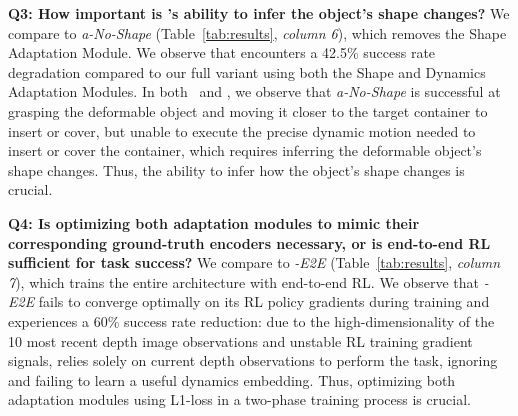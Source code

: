 \textbf{Q3: How important is \methodname{}'s ability to infer the object's shape changes?} We compare \methodname{} to \textit{a\methodname{}-No-Shape} (Table~\ref{tab:results}, \textit{column 6}), which removes the Shape Adaptation Module. We observe that \methodname{} encounters a 42.5\% success rate degradation compared to our full variant using both the Shape and Dynamics Adaptation Modules. In both \taskone~and \tasktwo, we observe that \textit{a\methodname{}-No-Shape} is successful at grasping the deformable object and moving it closer to the target container to insert or cover, but unable to execute the precise dynamic motion needed to insert or cover the container, which requires inferring the deformable object's shape changes. Thus, the ability to infer how the object's shape changes is crucial. 

\textbf{Q4: Is optimizing both adaptation modules to mimic their corresponding ground-truth encoders necessary, or is end-to-end RL sufficient for task success?} We compare \methodname{} to \textit{\methodname{}-E2E} (Table~\ref{tab:results}, \textit{column 7}), which trains the entire architecture with end-to-end RL. We observe that \textit{\methodname{}-E2E} fails to converge optimally on its RL policy gradients during training and experiences a 60\% success rate reduction: due to the high-dimensionality of the 10 most recent depth image observations and unstable RL training gradient signals, \methodname{} relies solely on current depth observations to perform the task, ignoring and failing to learn a useful dynamics embedding. Thus, optimizing both adaptation modules using L1-loss in a two-phase training process is crucial. 